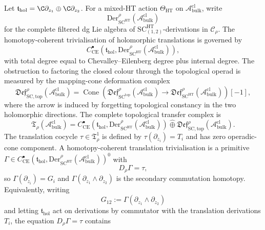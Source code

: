 \begin{defn}
\label{defn:topological-transfer-complex}
Let
\(\mathfrak t_{\mathrm{hol}}=\C\partial_{z_1}\oplus
\C\partial_{z_2}\).  For a mixed-HT action
\(\Theta_{\mathrm{HT}}\) on \(\mathcal A^{\mathrm{cl}}_{\mathrm{bulk}}\),
write
\[
  \mathrm{Der}^{\rho}_{\mathrm{SC}^{\mathrm{HT}}}
  (\mathcal A^{\mathrm{cl}}_{\mathrm{bulk}})
\]
for the complete filtered dg Lie algebra of
\(\mathrm{SC}^{\mathrm{HT}}_{(1,2)}\)-derivations in
\(\mathcal C_\rho\).  The homotopy-coherent trivialisation of
holomorphic translations is governed by
\[
  C^\bullet_{\mathrm{CE}}\!\left(
    \mathfrak t_{\mathrm{hol}},
    \mathrm{Der}^{\rho}_{\mathrm{SC}^{\mathrm{HT}}}
    (\mathcal A^{\mathrm{cl}}_{\mathrm{bulk}})\right),
\]
with total degree equal to Chevalley--Eilenberg degree plus internal
degree.  The obstruction to factoring the closed colour through the
topological operad is measured by the mapping-cone deformation complex
\[
  \mathfrak{Def}^{\rho}_{\mathrm{SC},\mathrm{top}}
  (\mathcal A^{\mathrm{cl}}_{\mathrm{bulk}})
  =
  \operatorname{Cone}\!\left(
    \mathfrak{Def}^{\rho}_{\mathrm{SC}^{\mathrm{top}}}
    (\mathcal A^{\mathrm{cl}}_{\mathrm{bulk}})
    \longrightarrow
    \mathfrak{Def}^{\rho}_{\mathrm{SC}^{\mathrm{HT}}}
    (\mathcal A^{\mathrm{cl}}_{\mathrm{bulk}})
  \right)[-1],
\]
where the arrow is induced by forgetting topological constancy in the
two holomorphic directions.  The complete topological transfer complex is
\[
  \mathfrak T_\rho(\mathcal A^{\mathrm{cl}}_{\mathrm{bulk}})
  =
  C^\bullet_{\mathrm{CE}}\!\left(
    \mathfrak t_{\mathrm{hol}},
    \mathrm{Der}^{\rho}_{\mathrm{SC}^{\mathrm{HT}}}
    (\mathcal A^{\mathrm{cl}}_{\mathrm{bulk}})\right)
  \widehat\oplus
  \mathfrak{Def}^{\rho}_{\mathrm{SC},\mathrm{top}}
  (\mathcal A^{\mathrm{cl}}_{\mathrm{bulk}}).
\]
The translation cocycle \(\tau\in\mathfrak T_\rho^1\) is defined by
\(\tau(\partial_{z_i})=T_i\) and has zero operadic-cone component.  A
homotopy-coherent translation trivialisation is a primitive
\(\Gamma\in
C^\bullet_{\mathrm{CE}}(\mathfrak t_{\mathrm{hol}},
\mathrm{Der}^{\rho}_{\mathrm{SC}^{\mathrm{HT}}}
(\mathcal A^{\mathrm{cl}}_{\mathrm{bulk}}))^0\)
with
\[
  D_\rho\Gamma=\tau,
\]
so \(\Gamma(\partial_{z_i})=G_i\) and
\(\Gamma(\partial_{z_1}\wedge\partial_{z_2})\) is the secondary
commutation homotopy.  Equivalently, writing
\[
  G_{12}:=\Gamma(\partial_{z_1}\wedge\partial_{z_2})
\]
and letting \(\mathfrak t_{\mathrm{hol}}\) act on derivations by
commutator with the translation derivations \(T_i\), the equation
\(D_\rho\Gamma=\tau\) contains

\end{defn}
